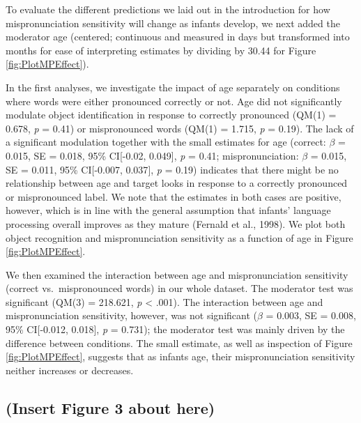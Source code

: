 \documentclass[man]{apa6}
\theoremstyle{definition}
\theoremstyle{definition}
\theoremstyle{definition}
\theoremstyle{remark}
\begin{document}
To evaluate the different predictions we laid out in the introduction
for how mispronunciation sensitivity will change as infants develop, we
next added the moderator age (centered; continuous and measured in days
but transformed into months for ease of interpreting estimates by
dividing by 30.44 for Figure \ref{fig:PlotMPEffect}).

In the first analyses, we investigate the impact of age separately on
conditions where words were either pronounced correctly or not. Age did
not significantly modulate object identification in response to
correctly pronounced (QM(1) = 0.678, \emph{p} = 0.41) or mispronounced
words (QM(1) = 1.715, \emph{p} = 0.19). The lack of a significant
modulation together with the small estimates for age (correct: \(\beta\)
= 0.015, SE = 0.018, 95\% CI{[}-0.02, 0.049{]}, \emph{p} = 0.41;
mispronunciation: \(\beta\) = 0.015, SE = 0.011, 95\% CI{[}-0.007,
0.037{]}, \emph{p} = 0.19) indicates that there might be no relationship
between age and target looks in response to a correctly pronounced or
mispronounced label. We note that the estimates in both cases are
positive, however, which is in line with the general assumption that
infants' language processing overall improves as they mature (Fernald et
al., 1998). We plot both object recognition and mispronunciation
sensitivity as a function of age in Figure \ref{fig:PlotMPEffect}.

We then examined the interaction between age and mispronunciation
sensitivity (correct vs.~mispronounced words) in our whole dataset. The
moderator test was significant (QM(3) = 218.621, \emph{p} \textless{}
.001). The interaction between age and mispronunciation sensitivity,
however, was not significant (\(\beta\) = 0.003, SE = 0.008, 95\%
CI{[}-0.012, 0.018{]}, \emph{p} = 0.731); the moderator test was mainly
driven by the difference between conditions. The small estimate, as well
as inspection of Figure \ref{fig:PlotMPEffect}, suggests that as infants
age, their mispronunciation sensitivity neither increases or decreases.

\subsection{(Insert Figure 3 about
here)}\label{insert-figure-3-about-here}
\end{document}
